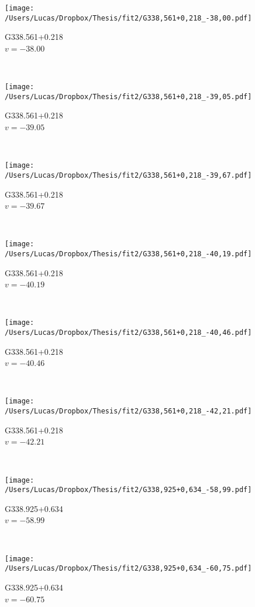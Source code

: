 \begin{figure*}[t]\ContinuedFloat
	\centering
	\begin{subfigure}[t]{0.3\textwidth}
		\texttt{[image: /Users/Lucas/Dropbox/Thesis/fit2/G338,561+0,218\_-38,00.pdf]}
		\caption[]{G338.561+0.218\\$v=-38.00$\,\kms}
	\end{subfigure}
	~
	\begin{subfigure}[t]{0.3\textwidth}
		\texttt{[image: /Users/Lucas/Dropbox/Thesis/fit2/G338,561+0,218\_-39,05.pdf]}
		\caption[]{G338.561+0.218\\$v=-39.05$\,\kms}
	\end{subfigure}
	~
	\begin{subfigure}[t]{0.3\textwidth}
		\texttt{[image: /Users/Lucas/Dropbox/Thesis/fit2/G338,561+0,218\_-39,67.pdf]}
		\caption[]{G338.561+0.218\\$v=-39.67$\,\kms}
	\end{subfigure}
	~
	\begin{subfigure}[t]{0.3\textwidth}
		\texttt{[image: /Users/Lucas/Dropbox/Thesis/fit2/G338,561+0,218\_-40,19.pdf]}
		\caption[]{G338.561+0.218\\$v=-40.19$\,\kms}
	\end{subfigure}
	~
	\begin{subfigure}[t]{0.3\textwidth}
		\texttt{[image: /Users/Lucas/Dropbox/Thesis/fit2/G338,561+0,218\_-40,46.pdf]}
		\caption[]{G338.561+0.218\\$v=-40.46$\,\kms}
	\end{subfigure}
	~
	\begin{subfigure}[t]{0.3\textwidth}
		\texttt{[image: /Users/Lucas/Dropbox/Thesis/fit2/G338,561+0,218\_-42,21.pdf]}
		\caption[]{G338.561+0.218\\$v=-42.21$\,\kms}
	\end{subfigure}
	~
	\begin{subfigure}[t]{0.3\textwidth}
		\texttt{[image: /Users/Lucas/Dropbox/Thesis/fit2/G338,925+0,634\_-58,99.pdf]}
		\caption[]{G338.925+0.634\\$v=-58.99$\,\kms}
	\end{subfigure}
	~
	\begin{subfigure}[t]{0.3\textwidth}
		\texttt{[image: /Users/Lucas/Dropbox/Thesis/fit2/G338,925+0,634\_-60,75.pdf]}
		\caption[]{G338.925+0.634\\$v=-60.75$\,\kms}

\end{subfigure}
\end{figure*}
